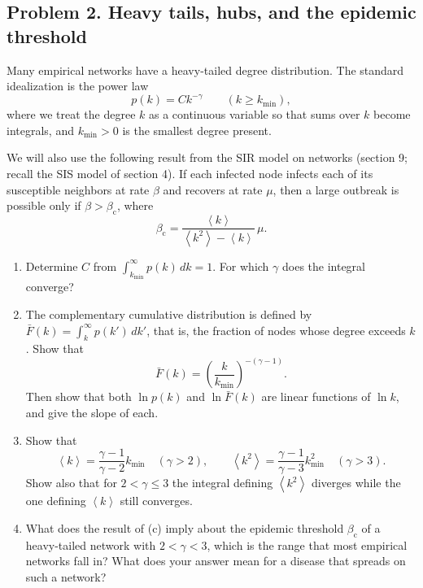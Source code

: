 \documentclass[a4paper,12pt]{article}
\newcommand{\dd}{\,d}
\begin{document}
\subsection*{Problem 2. Heavy tails, hubs, and the epidemic threshold}

Many empirical networks have a heavy-tailed degree distribution. The standard idealization is the power law
\[ p(k) = C k^{-\gamma} \qquad (k \geq k_{\min}), \]
where we treat the degree $k$ as a continuous variable so that sums over $k$ become integrals, and $k_{\min}>0$ is the smallest degree present.

We will also use the following result from the SIR model on networks (section 9; recall the SIS model of section 4). If each infected node infects each of its susceptible neighbors at rate $\beta$ and recovers at rate $\mu$, then a large outbreak is possible only if $\beta>\beta_{\text{c}}$, where
\[ \beta_{\text{c}} = \frac{\left\langle k \right\rangle}{\left\langle k^2 \right\rangle - \left\langle k \right\rangle}\, \mu . \]

\begin{enumerate}[label=(\alph*)]
\item Determine $C$ from $\int_{k_{\min}}^{\infty} p(k) \dd k = 1$. For which $\gamma$ does the integral converge?

\item The complementary cumulative distribution is defined by $\bar{F}(k) = \int_{k}^{\infty} p(k')\dd k'$, that is, the fraction of nodes whose degree exceeds $k$. Show that
\[ \bar{F}(k) = \left( \frac{k}{k_{\min}} \right)^{-(\gamma-1)} . \]
Then show that both $\ln p(k)$ and $\ln \bar{F}(k)$ are linear functions of $\ln k$, and give the slope of each.

\item Show that
\[ \left\langle k \right\rangle = \frac{\gamma-1}{\gamma-2} k_{\min} \quad (\gamma>2),
\qquad
\left\langle k^2 \right\rangle = \frac{\gamma-1}{\gamma-3} k_{\min}^2 \quad (\gamma>3) . \]
Show also that for $2<\gamma\leq 3$ the integral defining $\left\langle k^2 \right\rangle$ diverges while the one defining $\left\langle k \right\rangle$ still converges.

\item What does the result of (c) imply about the epidemic threshold $\beta_{\text{c}}$ of a heavy-tailed network with $2<\gamma<3$, which is the range that most empirical networks fall in? What does your answer mean for a disease that spreads on such a network?
\end{enumerate}
\end{document}
